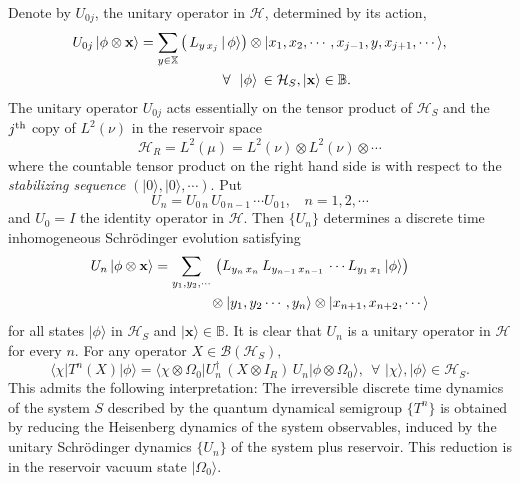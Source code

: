 Denote by $U_{0j}$, the unitary operator in $\mathcal{H}$, determined by its action, 
\begin{align} 
U_{0j}\, \vert \phi \otimes \mathbf{x}\rangle & = \sum_{y\in\mathbb{X}} \left(\, L_{y\, x_j}\, \vert\,\phi\rangle\right)\otimes \vert x_1,x_2,\cdots , x_{j-1}, y, x_{j+1},\cdots \rangle,\notag \\
& \qquad \qquad \qquad \forall\ \ \vert\phi\rangle\,\in \mathcal{H}_S, \vert\mathbf{x}\rangle\in\mathbb{B}.  \label{chap5-eq2.4}
\end{align} 
The unitary operator $U_{0j}$ acts essentially on the tensor product of $\mathcal{H}_S$ and the $j^{\rm th}$ copy of $L^2(\nu)$ in 
the reservoir space 
$$
\mathcal{H}_R=L^2(\mu)=L^2(\nu)\otimes L^2(\nu)\otimes \cdots 
$$
where the countable tensor product on the right hand side is with respect to the {\it stabilizing sequence} 
$(\vert 0\rangle, \vert 0\rangle, \cdots )$. Put 
\begin{equation} 
U_n=U_{0\,n}\, U_{0\,n-1}\, \cdots U_{0\,1},\ \ \ \  n=1,2,\cdots  \label{chap5-eq2.5}
\end{equation}     
and $U_0=I$ the identity operator in $\mathcal{H}$. Then $\{U_n\}$ determines a discrete time inhomogeneous Schr{\"o}dinger evolution satisfying 
\begin{align}
U_n\, \vert \phi \otimes \mathbf{x}\rangle & = \sum_{y_1,y_2,\cdots}\,  \left(L_{y_n\,x_n}\, L_{y_{n-1}\,x_{n-1}}\, \cdots  L_{y_1\,x_1}\, \vert \phi\rangle\right)\notag \\ 
& \qquad \qquad \otimes \vert y_1,y_2\cdots , y_n\rangle \otimes  \vert x_{n+1},x_{n+2},\cdots \rangle  \label{chap5-eq2.6}
\end{align} 
for all states $\vert \phi\rangle$ in $\mathcal{H}_S$ and $\vert \mathbf{x}\rangle\in \mathbb{B}.$
It is clear that  $U_n$ is a unitary operator in $\mathcal{H}$ for every $n$. For any operator $X\in \mathcal{B}(\mathcal{H}_S),$  
\begin{equation} 
\langle \chi\vert T^{n}(X)\vert \phi\rangle =\langle \chi\otimes \Omega_0\vert U_n^\dag\, (X\otimes I_R)\, U_n\vert \phi\otimes \Omega_0\rangle,\ \ \forall\,\, \vert \chi\rangle,\vert \phi\rangle\in \mathcal{H}_S.  \label{chap5-eq2.7}
\end{equation}    
This admits the following interpretation: The irreversible discrete time dynamics of the system $S$ described by the quantum dynamical semigroup $\{T^n\}$ is obtained by reducing the Heisenberg dynamics of the system observables, induced by the unitary Schr{\"o}dinger dynamics $\{U_n\}$ of the system plus reservoir. This reduction is in the reservoir vacuum state $\vert \Omega_0\rangle$. 

